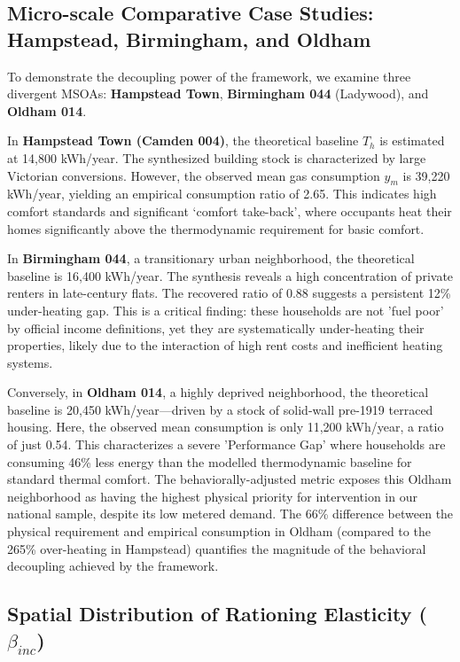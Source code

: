 \documentclass[11pt, a4paper, twocolumn]{article}
\begin{document}
\subsection{Micro-scale Comparative Case Studies: Hampstead, Birmingham, and 
Oldham}\label{micro-scale-comparative-case-studies}

To demonstrate the decoupling power of the framework, we examine three 
divergent MSOAs: \textbf{Hampstead Town}, \textbf{Birmingham 044} (Ladywood), and 
\textbf{Oldham 014}.

In \textbf{Hampstead Town (Camden 004)}, the 
theoretical baseline \(T_h\) is estimated at 14,800 kWh/year. The 
synthesized building stock is characterized by large Victorian conversions. However, the observed mean gas consumption \(y_m\) is 
39,220 kWh/year, yielding an empirical consumption ratio of 2.65. This 
indicates high comfort standards and significant `comfort take-back', where occupants heat their homes significantly above the thermodynamic requirement for basic comfort.

In \textbf{Birmingham 044}, a transitionary urban neighborhood, the 
theoretical baseline is 16,400 kWh/year. The synthesis reveals a high concentration of private renters in late-century flats. The recovered ratio of 0.88 suggests a persistent 12\% under-heating gap. This is a critical finding: these households are not 'fuel poor' by official income definitions, yet they are systematically under-heating their properties, likely due to the interaction of high rent costs and inefficient heating systems.

Conversely, in \textbf{Oldham 014}, a highly deprived neighborhood, the 
theoretical baseline is 20,450 kWh/year—driven by a stock of solid-wall pre-1919 terraced housing. Here, the observed mean consumption is only 11,200 kWh/year, a ratio of just 0.54. This characterizes a severe 'Performance Gap' where households are consuming 46\% less energy than the modelled thermodynamic baseline for standard thermal comfort. The behaviorally-adjusted metric exposes this Oldham neighborhood as having the highest physical priority for intervention in our national sample, despite its low metered demand. The 66\% difference between the physical requirement and empirical consumption in Oldham (compared to the 265\% over-heating in Hampstead) quantifies the magnitude of the behavioral decoupling achieved by the framework.

\subsection{\texorpdfstring{Spatial Distribution of Rationing 
Elasticity
(\(\beta_{inc}\))}{Spatial Distribution of Rationing Elasticity 
(\textbackslash beta\_\{inc\})}}\label{spatial-distribution-of-rationing-elasticity-beta_inc}
\end{document}

